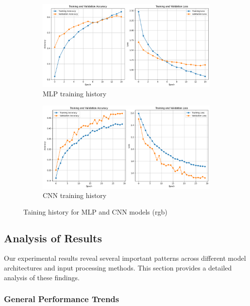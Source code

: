 \documentclass{article}
\begin{document}
\begin{figure}[H]
    \centering
    \begin{subfigure}[b]{0.48\textwidth}
        \includegraphics[width=\textwidth]{assets/confusion_matrix/rgb/MLP_history.png}
        \caption{MLP training history}
    \end{subfigure}
    \hfill
    \begin{subfigure}[b]{0.48\textwidth}
        \includegraphics[width=\textwidth]{assets/confusion_matrix/rgb/CNN_history.png}
        \caption{CNN training history}
    \end{subfigure}
    \caption{Taining history for MLP and CNN models (rgb)}
    \label{fig:rgb_training_history}
\end{figure}

\newpage
\subsection{Analysis of Results}

Our experimental results reveal several important patterns across different model architectures and input processing methods. This section provides a detailed analysis of these findings.

\subsubsection{General Performance Trends}
\end{document}
